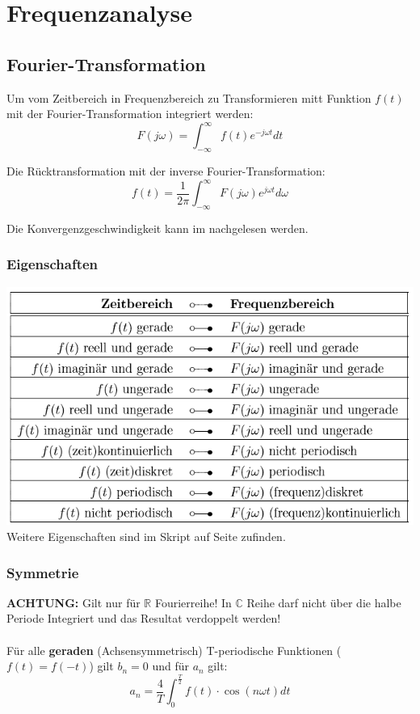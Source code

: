 \section{Frequenzanalyse}
\subsection{Fourier-Transformation}
 Um vom Zeitbereich in Frequenzbereich zu Transformieren mitt Funktion $f(t)$ mit der Fourier-Transformation integriert werden:
\[
	F(j\omega) = \int_{-\infty}^{\infty}f(t)e^{-j\omega t}dt
\]

Die Rücktransformation mit der inverse Fourier-Transformation:
\[
f(t) = \frac{1}{2\pi}\int_{-\infty}^{\infty}F(j\omega)e^{j\omega t}d\omega
\]

Die Konvergenzgeschwindigkeit kann im  nachgelesen werden.

\subsubsection{Eigenschaften}
\includegraphics[width=\columnwidth]{Images/fourier_eigenschaten}
Weitere Eigenschaften sind im Skript auf Seite  zufinden.

\subsubsection{Symmetrie}
\textbf{ACHTUNG:} Gilt nur für $\mathbb{R}$ Fourierreihe! In $\mathbb{C}$ Reihe darf nicht über die halbe Periode Integriert und das Resultat verdoppelt werden! 
~\\
~\\
\noindent Für alle \textbf{geraden} (Achsensymmetrisch) T-periodische Funktionen ($f(t) = f(-t)$)  gilt $b_n = 0$ und für $a_n$ gilt:
\[
a_n = \frac{4}{T}\int_{0}^{\frac{T}{2}}f(t) \cdot \cos(n\omega t)dt
\]

